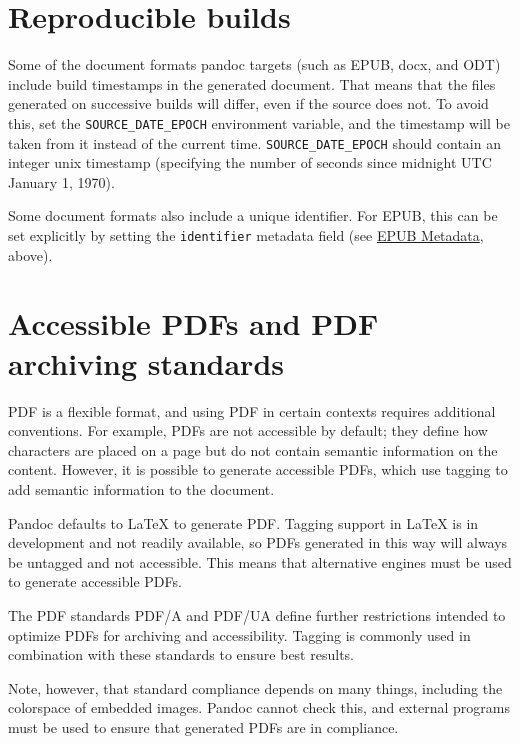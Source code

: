 \documentclass[
  a4paper,
]{article}
\begin{document}
\hypertarget{reproducible-builds}{%
\section{Reproducible builds}\label{reproducible-builds}}

Some of the document formats pandoc targets (such as EPUB, docx, and
ODT) include build timestamps in the generated document. That means that
the files generated on successive builds will differ, even if the source
does not. To avoid this, set the \texttt{SOURCE\_DATE\_EPOCH}
environment variable, and the timestamp will be taken from it instead of
the current time. \texttt{SOURCE\_DATE\_EPOCH} should contain an integer
unix timestamp (specifying the number of seconds since midnight UTC
January 1, 1970).

Some document formats also include a unique identifier. For EPUB, this
can be set explicitly by setting the \texttt{identifier} metadata field
(see \protect\hyperlink{epub-metadata}{EPUB Metadata}, above).

\hypertarget{accessible-pdfs-and-pdf-archiving-standards}{%
\section{Accessible PDFs and PDF archiving
standards}\label{accessible-pdfs-and-pdf-archiving-standards}}

PDF is a flexible format, and using PDF in certain contexts requires
additional conventions. For example, PDFs are not accessible by default;
they define how characters are placed on a page but do not contain
semantic information on the content. However, it is possible to generate
accessible PDFs, which use tagging to add semantic information to the
document.

Pandoc defaults to LaTeX to generate PDF. Tagging support in LaTeX is in
development and not readily available, so PDFs generated in this way
will always be untagged and not accessible. This means that alternative
engines must be used to generate accessible PDFs.

The PDF standards PDF/A and PDF/UA define further restrictions intended
to optimize PDFs for archiving and accessibility. Tagging is commonly
used in combination with these standards to ensure best results.

Note, however, that standard compliance depends on many things,
including the colorspace of embedded images. Pandoc cannot check this,
and external programs must be used to ensure that generated PDFs are in
compliance.
\end{document}
